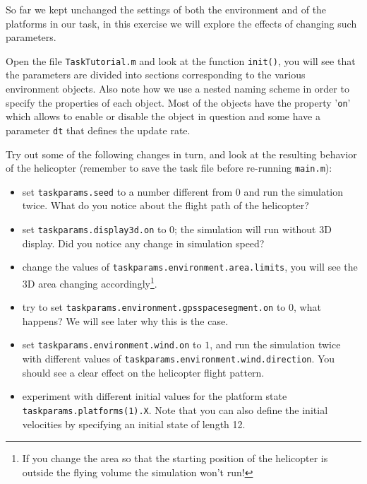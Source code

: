 \documentclass[a4paper,11pt]{article}
\begin{document}
So far we kept unchanged the settings of both the environment and of the platforms in our task, in this exercise we will explore the effects of changing such parameters.

Open the file \texttt{TaskTutorial.m} and look at the function \texttt{init()}, you will see that the parameters are divided into sections corresponding to the various environment objects. Also note how we use a nested naming scheme in order to specify the properties of each object.
Most of the objects have the property '\texttt{on}' which allows to enable or disable the object in question and some have a parameter \texttt{dt} that defines the update rate.

Try out some of the following changes \textsf{in turn}, and look at the resulting behavior of the helicopter (remember to save the task file before re-running \texttt{main.m}): 
\begin{itemize}
 \item set \texttt{taskparams.seed} to a number different from $0$ and run the simulation twice. What do you notice about the flight path of the helicopter?
 \item set \texttt{taskparams.display3d.on} to $0$; the simulation will run without 3D display. Did you notice any change in simulation speed?
 \item change the values of \texttt{taskparams.environment.area.limits}, you will see the 3D area changing accordingly\footnote{If you change the area so that the starting position of the helicopter is outside the flying volume the simulation won't run!}.
 \item try to set \texttt{taskparams.environment.gpsspacesegment.on} to $0$, what happens? We will see later why this is the case.
 \item set \texttt{taskparams.environment.wind.on} to $1$, and run the simulation twice with different values of \texttt{taskparams.environment.wind.direction}. You should see a clear effect on the helicopter flight pattern.
 \item experiment with different initial values for the platform state \texttt{taskparams.platforms(1).X}. Note that you can also define the initial velocities by specifying an initial state of length 12.
\end{itemize}
\end{document}
